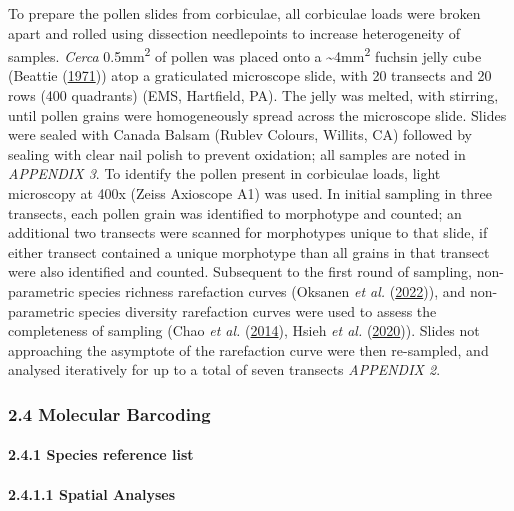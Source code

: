 \documentclass[
]{article}
\begin{document}
To prepare the pollen slides from corbiculae, all corbiculae loads were
broken apart and rolled using dissection needlepoints to increase
heterogeneity of samples. \emph{Cerca} 0.5mm\textsuperscript{2} of
pollen was placed onto a \textasciitilde4mm\textsuperscript{2} fuchsin
jelly cube (Beattie
(\protect\hyperlink{ref-beattie1971technique}{1971})) atop a
graticulated microscope slide, with 20 transects and 20 rows (400
quadrants) (EMS, Hartfield, PA). The jelly was melted, with stirring,
until pollen grains were homogeneously spread across the microscope
slide. Slides were sealed with Canada Balsam (Rublev Colours, Willits,
CA) followed by sealing with clear nail polish to prevent oxidation; all
samples are noted in \emph{APPENDIX 3}. To identify the pollen present
in corbiculae loads, light microscopy at 400x (Zeiss Axioscope A1) was
used. In initial sampling in three transects, each pollen grain was
identified to morphotype and counted; an additional two transects were
scanned for morphotypes unique to that slide, if either transect
contained a unique morphotype than all grains in that transect were also
identified and counted. Subsequent to the first round of sampling,
non-parametric species richness rarefaction curves (Oksanen \emph{et
al.} (\protect\hyperlink{ref-vegans2022}{2022})), and non-parametric
species diversity rarefaction curves were used to assess the
completeness of sampling (Chao \emph{et al.}
(\protect\hyperlink{ref-inextArticle}{2014}), Hsieh \emph{et al.}
(\protect\hyperlink{ref-inextPackage}{2020})). Slides not approaching
the asymptote of the rarefaction curve were then re-sampled, and
analysed iteratively for up to a total of seven transects \emph{APPENDIX
2}.

\hypertarget{molecular-barcoding}{%
\subsubsection{2.4 \textbar{} Molecular
Barcoding}\label{molecular-barcoding}}

\hypertarget{species-reference-list}{%
\paragraph{2.4.1 \textbar{} Species reference
list}\label{species-reference-list}}

\hypertarget{spatial-analyses}{%
\paragraph{2.4.1.1 Spatial Analyses}\label{spatial-analyses}}
\end{document}
